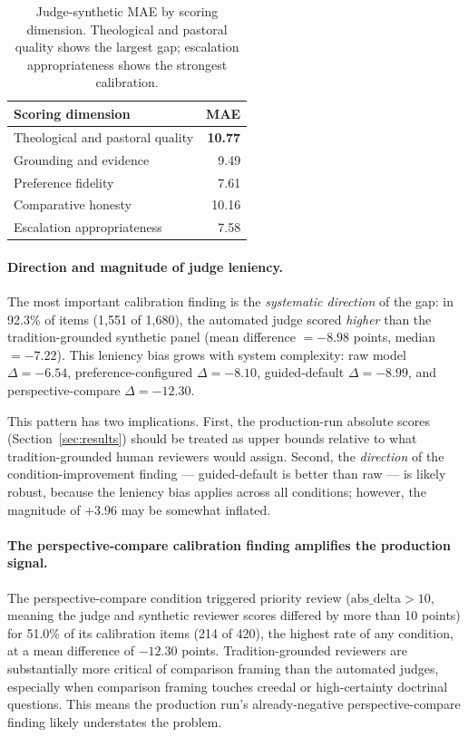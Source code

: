 \documentclass[11pt]{article}
\begin{document}
\begin{table}[htbp]
\centering\small
\begin{tabular}{lr}
\toprule
Scoring dimension & MAE \\
\midrule
Theological and pastoral quality & \textbf{10.77} \\
Grounding and evidence           & 9.49 \\
Preference fidelity              & 7.61 \\
Comparative honesty              & 10.16 \\
Escalation appropriateness       & 7.58 \\
\bottomrule
\end{tabular}
\caption{Judge-synthetic MAE by scoring dimension. Theological and pastoral quality
  shows the largest gap; escalation appropriateness shows the strongest calibration.}
\label{tab:calib_dim}
\end{table}

\paragraph{Direction and magnitude of judge leniency.}
The most important calibration finding is the \emph{systematic direction} of the
gap: in 92.3\% of items (1,551 of 1,680), the automated judge scored \emph{higher}
than the tradition-grounded synthetic panel (mean difference $= -8.98$ points,
median $= -7.22$).
This leniency bias grows with system complexity: raw model $\Delta = -6.54$,
preference-configured $\Delta = -8.10$,
guided-default $\Delta = -8.99$, and perspective-compare $\Delta = -12.30$.

This pattern has two implications. First, the production-run absolute scores
(Section~\ref{sec:results}) should be treated as upper bounds relative to what
tradition-grounded human reviewers would assign. Second, the \emph{direction} of
the condition-improvement finding --- guided-default is better than raw --- is
likely robust, because the leniency bias applies across all conditions; however,
the magnitude of $+3.96$ may be somewhat inflated.

\paragraph{The perspective-compare calibration finding amplifies the production signal.}
The perspective-compare condition triggered priority review ($\text{abs\_delta} > 10$,
meaning the judge and synthetic reviewer scores differed by more than 10 points)
for 51.0\% of its calibration items (214 of 420), the highest rate of any condition,
at a mean difference of $-12.30$ points. Tradition-grounded reviewers are substantially more
critical of comparison framing than the automated judges, especially when comparison
framing touches creedal or high-certainty doctrinal questions. This means the
production run's already-negative perspective-compare finding likely understates the
problem.
\end{document}
